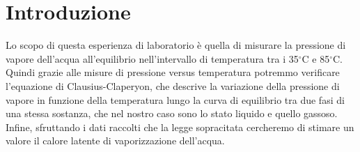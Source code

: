 \section{Introduzione}

Lo scopo di questa esperienza di laboratorio è quella di misurare la pressione
di vapore dell'acqua all'equilibrio nell'intervallo di temperatura tra i 35$^\circ$C
e 85$^\circ$C. Quindi grazie alle misure di pressione versus temperatura potremmo verificare
l'equazione di Clausius-Claperyon, che descrive la variazione della pressione di vapore
in funzione della temperatura lungo la curva di equilibrio tra due fasi di una stessa sostanza,
che nel nostro caso sono lo stato liquido e quello gassoso.
Infine, sfruttando i dati raccolti che la legge sopracitata cercheremo di stimare un valore
il calore latente di vaporizzazione dell'acqua.
